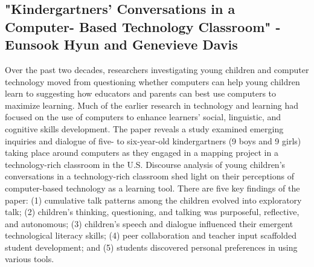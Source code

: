 \documentclass[sigchi]{acmart}
\begin{document}
		\subsection{"Kindergartners' Conversations in a Computer- Based Technology Classroom" - Eunsook Hyun and Genevieve Davis }
			Over the past two decades, researchers investigating young children and computer technology moved from questioning whether computers can help young children learn to suggesting how educators and parents can best use computers to maximize learning. Much of the earlier research in technology and learning had focused on the use of computers to enhance learners' social, linguistic, and cognitive skills development.
			The paper reveals a study examined emerging inquiries and dialogue of five- to six-year-old kindergartners (9 boys and 9 girls) taking place around computers as they engaged in a mapping project in a technology-rich classroom in the U.S. Discourse analysis of young children's conversations in a technology-rich classroom shed light on their perceptions of computer-based technology as a learning tool. There are five key findings of the paper: (1) cumulative talk patterns among the children evolved into exploratory talk; (2) children's thinking, questioning, and talking was purposeful, reflective, and autonomous; (3) children's speech and dialogue influenced their emergent technological literacy skills; (4) peer collaboration and teacher input scaffolded student development; and (5) students discovered personal preferences in using various tools.
\end{document}
